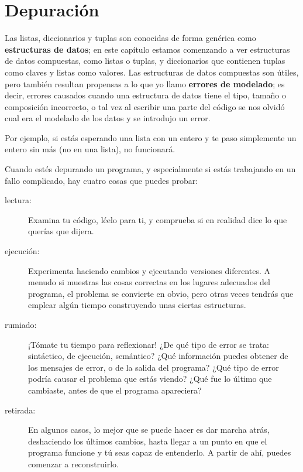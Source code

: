 

\section{Depuración}


Las listas, diccionarios y tuplas son conocidas de forma genérica como
{\bf estructuras de datos}; en este capítulo estamos comenzando a ver
estructuras de datos compuestas, como listas o tuplas, y diccionarios que contienen tuplas
como claves y listas como valores. Las estructuras de datos compuestas son útiles, pero
también resultan propensas a lo que yo llamo {\bf errores de modelado}; es decir, errores
causados cuando una estructura de datos tiene el tipo, tamaño o composición incorrecto,
o tal vez al escribir una parte del código se nos olvidó cual era el modelado
de los datos y se introdujo un error.

Por ejemplo, si estás esperando una lista con un entero y te
paso simplemente un entero sin más (no en una lista), no funcionará.

Cuando estés depurando un programa, y especialmente si estás
trabajando en un fallo complicado, hay cuatro cosas que puedes probar:

\begin{description}

\item[lectura:] Examina tu código, léelo para ti, y comprueba
si en realidad dice lo que querías que dijera.

\item[ejecución:] Experimenta haciendo cambios y ejecutando versiones
diferentes. A menudo si muestras las cosas correctas en los lugares
adecuados del programa, el problema se convierte en obvio, pero otras veces
tendrás que emplear algún tiempo construyendo unas ciertas estructuras.

\item[rumiado:] ¡Tómate tu tiempo para reflexionar! ¿De qué tipo de error
se trata: sintáctico, de ejecución, semántico? ¿Qué información puedes obtener de
los mensajes de error, o de la salida del programa? ¿Qué tipo de
error podría causar el problema que estás viendo? ¿Qué fue lo último
que cambiaste, antes de que el programa apareciera?

\item[retirada:] En algunos casos, lo mejor que se puede hacer
es dar marcha atrás, deshaciendo los últimos cambios, hasta llegar
a un punto en que el programa funcione y tú seas capaz de entenderlo. A partir de ahí,
puedes comenzar a reconstruirlo.

\end{description}

